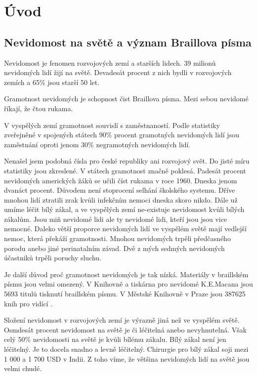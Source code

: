 
\chapter{Úvod}

\section{Nevidomost na světě a význam Braillova písma}

Nevidomost je fenomen rozvojových zemí a starších lidech. 39 milionů nevidomých lidí žijí na světě. Devadesát procent z nich bydli v rozvojových zemích a 65\% jsou starší 50 let\citep{whodata}.

Gramotnost nevidomých je schopnost čist Braillova písma.  Mezi sebou nevidomé říkají, že čtou rukama.

V vyspělých zemí gramotnost souvislí s zaměstnaností. Podle statistiky zveřejněné v spojených státech 90\% procent gramotných nevidomých lidí jsou zaměstnání oproti jenom 30\% negramotných nevidomých lidí.

Nenašel jsem podobná čísla pro české republiky ani rozvojový svět.  Do jisté míru statistiky jsou zkreslené.  V státech gramotnost značně poklesá.  Padesát procent nevidomých amerických žáků se učili číst rukama v roce 1960. Dneska jenom dvanáct procent.  Důvodem není stoprocení selhání školského systemu. Dříve mnohou lidí ztratili zrak kvůli infekčním nemoci dneska skoro nikdo. Dále už umíme léčit bílý zákal, a ve vyspělých zemí ne-existuje nevidomost kvůli bílých zákalům.  Jsou miň nevidomé lidi ale ty nevidomé lidi, kteří jsou jsou vice nemocné.  Daleko větší proporce nevidomých lidí ve vyspělém světě mají vedlejší nemoc, která překáží gramotnosti.  Mnohou nevidomých trpěli předčasného porodu anebo jiné perinatalním závad\citep{perkins,whozakal,whodata}.  Dvě z mých sedmých nevidomých účastniků trpěli poruchy sluchu.

Je další důvod proč gramotnost nevidomých je tak nízká.  Materiály v braillském písmu jsou velmi omezený.  V Knihovně a tiskárna pro nevidomé K.E.Macana jsou 5693 titulů tisknutí braillském písmu\citep{biblio}. V Městské Knihovně v Praze jsou 387625 knih pro vidící \citep{mlp}.

Složení nevidomost v rozvojových zemí je výrazně jiná než ve vyspělém světě. Osmdesát procent nevidomost na světě je či léčitelná anebo nevyhnutelná\citep{whodata}.  Však celý 50\% nevidomosti na světě je kvůli bílému zákalu\citep{whozakal}. Bílý zákal není jen léčitelný. Je to docela snadno a levně léčitelný. Chirurgie pro bílý zákal soji mezi 1 000 a 1 700 USD v Indii\citep{cataractsindia}. Z toho víme, že většina nevidomých lidí na světě jsou velmi chudé.

